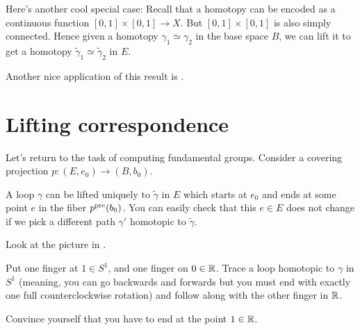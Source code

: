 \begin{remark}
	Here's another cool special case:
	Recall that a homotopy can be encoded as a continuous function $[0,1] \times [0,1] \to X$.
	But $[0,1] \times [0,1]$ is also simply connected.
	Hence given a homotopy $\gamma_1 \simeq \gamma_2$ in the base space $B$, we can lift it to get
 a homotopy $\tilde\gamma_1 \simeq \tilde\gamma_2$ in $E$.
\end{remark}
Another nice application of this result is .

\section{Lifting correspondence}
Let's return to the task of computing fundamental groups.
Consider a covering projection $p : (E, e_0) \to (B, b_0)$.

A loop $\gamma$ can be lifted uniquely to $\tilde\gamma$ in $E$
which starts at $e_0$ and ends at some point $e$ in the fiber $p^{\text{pre}}(b_0)$.
You can easily check that this $e \in E$ does not change if we
pick a different path $\gamma'$ homotopic to $\tilde\gamma$.
\begin{ques}
	Look at the picture in .

	Put one finger at $1 \in S^1$, and one finger on $0 \in \mathbb R$.
	Trace a loop homotopic to $\gamma$ in $S^1$ (meaning, you can
	go backwards and forwards but you must end with exactly one full
	counterclockwise rotation)
	and follow along with the other finger in $\mathbb R$.

	Convince yourself that you have to end at the point $1 \in \mathbb R$.
\end{ques}

